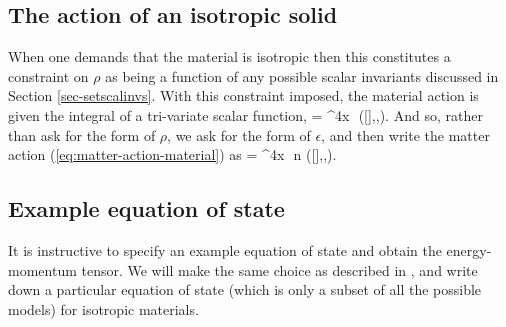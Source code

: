 \subsection{The action of an isotropic solid}
When one demands that the material is isotropic then this constitutes a constraint on  $\rho$ as being a  function of any possible scalar invariants discussed in Section \ref{sec-setscalinvs}. With this constraint imposed, the material action is given the integral of a tri-variate scalar function,
\bea
\label{eq:matter-action-material}
 = \int \dd^4x\,\, \rho\left([],,\right).
\eea
And so, rather than ask for the form of $\rho$, we ask for the form of $\epsilon$, and then write the matter action (\ref{eq:matter-action-material}) as
\bea
{} = \int \dd^4x\,\, n \epsilon\left([],,\right).
\eea
\subsection{Example equation of state}
It is instructive to specify an example equation of state and obtain the energy-momentum tensor. We will make the same choice as described in \cite{Karlovini:2002fc}, and write down a particular equation of state (which is only a subset of all the possible models) for isotropic materials.    

